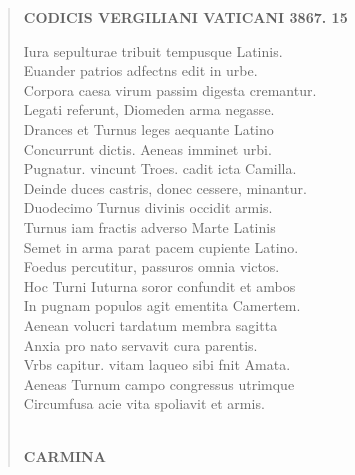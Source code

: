 \documentclass[11pt, a4paper]{report}
\begin{document}
\begin{verse}
    \begin{center} \textbf{CODICIS VERGILIANI VATICANI 3867. 15} \end{center}Iura sepulturae tribuit tempusque Latinis. \\ Euander patrios adfectns edit in urbe. \\ Corpora caesa virum passim digesta cremantur. \\ Legati referunt, Diomeden arma negasse. \\ Drances et Turnus leges aequante Latino \\ Concurrunt dictis. Aeneas imminet urbi. \\ Pugnatur. vincunt Troes. cadit icta Camilla. \\ Deinde duces castris, donec cessere, minantur. \\ Duodecimo Turnus divinis occidit armis. \\ Turnus iam fractis adverso Marte Latinis \\ Semet in arma parat pacem cupiente Latino. \\ Foedus percutitur, passuros omnia victos. \\ Hoc Turni Iuturna soror confundit et ambos \\ In pugnam populos agit ementita Camertem. \\ Aenean volucri tardatum membra sagitta \\ Anxia pro nato servavit cura parentis. \\ Vrbs capitur. vitam laqueo sibi fnit Amata. \\ Aeneas Turnum campo congressus utrimque \\ Circumfusa acie vita spoliavit et armis. \\ 
        ﻿\pagebreak 
    \begin{center} \textbf{CARMINA} \end{center} \marginpar{[16]} 
      \end{verse}
  
\end{document}
